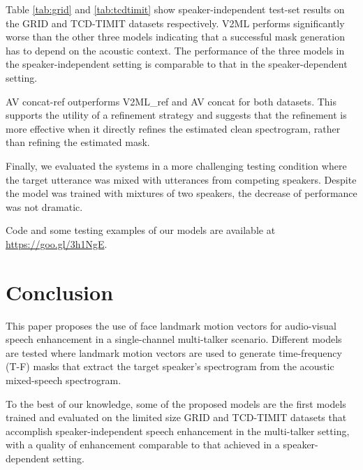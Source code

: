 \documentclass{article}
\begin{document}
Table \ref{tab:grid} and \ref{tab:tcdtimit} show speaker-independent test-set results on the GRID and TCD-TIMIT datasets respectively. V2ML performs significantly worse than the other three models indicating that a successful mask generation has to depend on the acoustic context.
The performance of the three models in the speaker-independent setting is comparable to that in the speaker-dependent setting.
 
AV concat-ref outperforms V2ML\_ref and AV concat for both datasets. This supports the utility of a refinement strategy and suggests that the refinement is more effective when it directly refines the estimated clean spectrogram, rather than refining the estimated mask.

Finally, we  evaluated the systems in a more challenging testing condition where the target utterance was mixed with  utterances from  competing speakers. 
Despite the model was trained with mixtures of two speakers, the decrease of performance was not dramatic. 

Code and some testing examples of our models are available at \url{https://goo.gl/3h1NgE}.


\section{Conclusion}
This paper proposes the use of face landmark motion vectors for audio-visual speech enhancement in a single-channel multi-talker scenario. Different models are tested where landmark motion vectors are used to generate time-frequency (T-F) masks that extract the target speaker's spectrogram from the acoustic mixed-speech spectrogram.

To the best of our knowledge, some of the proposed models are the first models trained and evaluated on the limited size GRID and TCD-TIMIT datasets that accomplish speaker-independent speech enhancement in the multi-talker setting,  with a quality of enhancement comparable to that achieved in a speaker-dependent setting.





\end{document}

